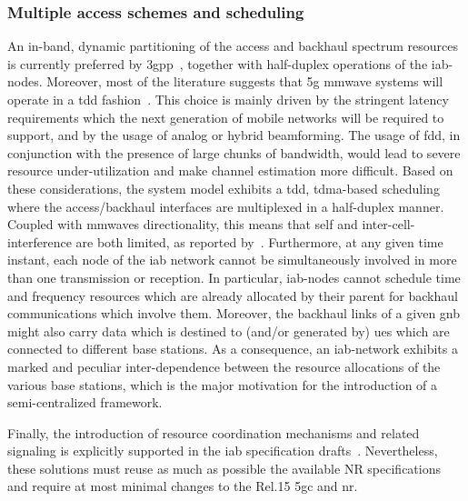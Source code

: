 \subsubsection{Multiple access schemes and scheduling}
An in-band, dynamic partitioning of the access and backhaul spectrum resources is currently preferred by \gls{3gpp}~\cite{3gpp_38_874, 3gpp_38_174}, together with half-duplex operations of the \gls{iab}-nodes. Moreover, most of the literature suggests that \gls{5g} \gls{mmwave} systems will operate in a \gls{tdd} fashion~\cite{khan2011mmwave, dutta2017frame}. This choice is mainly driven by the stringent latency requirements which the next generation of mobile networks will be required to support, and by the usage of analog or hybrid beamforming. The usage of \gls{fdd}, in conjunction with the presence of large chunks of bandwidth, would lead to severe resource under-utilization and make channel estimation more difficult.
Based on these considerations, the system model exhibits a \gls{tdd}, \gls{tdma}-based scheduling where the access/backhaul interfaces are multiplexed in a half-duplex manner. 
Coupled with \glspl{mmwave} directionality, this means that self and inter-cell-interference are both limited, as reported by~\cite{qualcomm1}.
Furthermore, at any given time instant, each node of the \gls{iab} network cannot be simultaneously involved in more than one transmission or reception. In particular, \gls{iab}-nodes cannot schedule time and frequency resources which are already allocated by their parent for backhaul communications which involve them.
Moreover, the backhaul links of a given \gls{gnb} might also carry data which is destined to (and/or generated by) \glspl{ue} which are connected to different base stations. 
As a consequence, an \gls{iab}-network exhibits a marked and peculiar inter-dependence between the resource allocations of the various base stations, which is the major motivation for the introduction of a semi-centralized framework. 

Finally, the introduction of resource coordination mechanisms and related signaling is explicitly supported in the \gls{iab} specification drafts~\cite{3gpp_38_874, 3gpp_38_174}. Nevertheless, these solutions must reuse as much as possible the available NR specifications and
require at most minimal changes to the Rel.15 \gls{5gc} and \gls{nr}.


